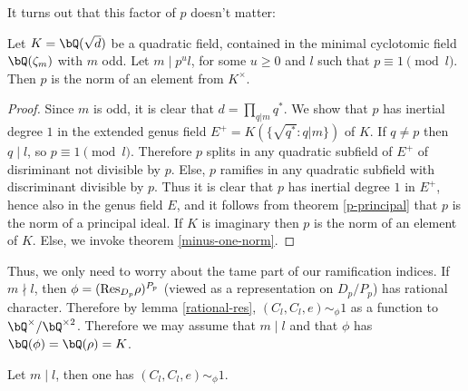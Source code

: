 It turns out that this factor of $p$ doesn't matter:

\begin{lemma}
    Let $K = \bQ(\sqrt{d})$ be a quadratic field, contained in the minimal cyclotomic field $\bQ(\zeta_m)$ with $m$ odd. Let $m \mid p^u l $, for some $u \geq 0$ and $l$ such that $p \equiv 1 \pmod l$. Then $p$ is the norm of an element from $K^{\times}$.
\end{lemma}

\begin{proof}
    Since $m$ is odd, it is clear that $d = \prod_{q | m} q^*$. We show that $p$ has inertial degree $1$ in the extended genus field $E^{+} = K(\{\sqrt{q^*} \colon q | m \})$ of $K$.
    If $q \not= p$ then $q \mid l$, so $p \equiv 1 \pmod l$. Therefore $p$ splits in any quadratic subfield of $E^{+}$ of disriminant not divisible by $p$. Else, $p$ ramifies in any quadratic subfield with discriminant divisible by $p$. Thus it is clear that $p$ has inertial degree $1$ in $E^{+}$, hence also in the genus field $E$, and it follows from theorem \ref{p-principal} that $p$ is the norm of a principal ideal. If $K$ is imaginary then $p$ is the norm of an element of $K$. Else, we invoke theorem \ref{minus-one-norm}.
\end{proof}

Thus, we only need to worry about the tame part of our ramification indices. If $m \nmid l$, then $\phi = (\mathrm{Res}_{D_p} \rho)^{P_p}$ (viewed as a representation on $D_p / P_p$) has rational character. Therefore by lemma \ref{rational-res}, $(C_l, C_l, e) \sim_{\phi} 1$ as a function to $\bQ^{\times} / \bQ^{\times 2}$.
Therefore we may assume that $m \mid l$ and that $\phi$ has $\bQ(\phi) = \bQ(\rho) = K$.

\begin{prop}
    Let $m \mid l$, then one has $(C_l, C_l, e) \sim_{\phi} 1$.   
\end{prop}

